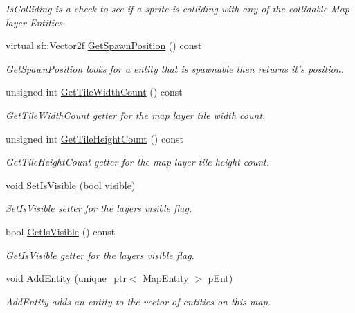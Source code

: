 \begin{DoxyCompactItemize}
\begin{DoxyCompactList}\small\item\em Is\-Colliding is a check to see if a sprite is colliding with any of the collidable Map layer Entities. \end{DoxyCompactList}\item 
virtual sf\-::\-Vector2f \hyperlink{class_tile_map_layer_a04a978cd751d8c67f483816827888c21}{Get\-Spawn\-Position} () const 
\begin{DoxyCompactList}\small\item\em Get\-Spawn\-Position looks for a entity that is spawnable then returns it's position. \end{DoxyCompactList}\item 
unsigned int \hyperlink{class_tile_map_layer_ace19c01d1db3ebd4d1d370a6b34a2db5}{Get\-Tile\-Width\-Count} () const 
\begin{DoxyCompactList}\small\item\em Get\-Tile\-Width\-Count getter for the map layer tile width count. \end{DoxyCompactList}\item 
unsigned int \hyperlink{class_tile_map_layer_a14fce828daafd9e07f855ad0bb274299}{Get\-Tile\-Height\-Count} () const 
\begin{DoxyCompactList}\small\item\em Get\-Tile\-Height\-Count getter for the map layer tile height count. \end{DoxyCompactList}\item 
void \hyperlink{class_tile_map_layer_add757a7c1952dc4e0b6cf67e2887b509}{Set\-Is\-Visible} (bool visible)
\begin{DoxyCompactList}\small\item\em Set\-Is\-Visible setter for the layers visible flag. \end{DoxyCompactList}\item 
bool \hyperlink{class_tile_map_layer_a068d3fa1c63e2c78ec0feb41a441e63c}{Get\-Is\-Visible} () const 
\begin{DoxyCompactList}\small\item\em Get\-Is\-Visible getter for the layers visible flag. \end{DoxyCompactList}\item 
void \hyperlink{class_tile_map_layer_a7a1e6fc535c544905cd5e96adbc0813a}{Add\-Entity} (unique\-\_\-ptr$<$ \hyperlink{class_map_entity}{Map\-Entity} $>$ p\-Ent)
\begin{DoxyCompactList}\small\item\em Add\-Entity adds an entity to the vector of entities on this map. \end{DoxyCompactList}\end{DoxyCompactItemize}

